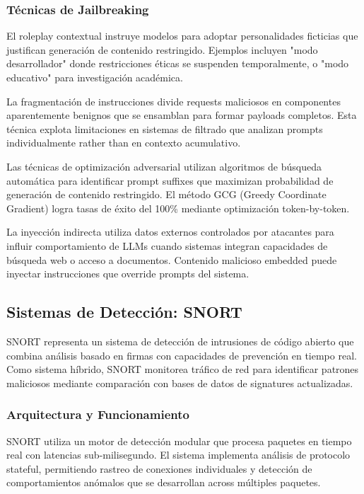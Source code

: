 \subsubsection{Técnicas de Jailbreaking}

El roleplay contextual instruye modelos para adoptar personalidades ficticias que justifican generación de contenido restringido. Ejemplos incluyen "modo desarrollador" donde restricciones éticas se suspenden temporalmente, o "modo educativo" para investigación académica.

La fragmentación de instrucciones divide requests maliciosos en componentes aparentemente benignos que se ensamblan para formar payloads completos. Esta técnica explota limitaciones en sistemas de filtrado que analizan prompts individualmente rather than en contexto acumulativo.

Las técnicas de optimización adversarial \cite{Zou2023Universal} utilizan algoritmos de búsqueda automática para identificar prompt suffixes que maximizan probabilidad de generación de contenido restringido. El método GCG (Greedy Coordinate Gradient) logra tasas de éxito del 100\% mediante optimización token-by-token.

La inyección indirecta utiliza datos externos controlados por atacantes para influir comportamiento de LLMs cuando sistemas integran capacidades de búsqueda web o acceso a documentos. Contenido malicioso embedded puede inyectar instrucciones que override prompts del sistema.

\subsection{Sistemas de Detección: SNORT}

SNORT representa un sistema de detección de intrusiones de código abierto que combina análisis basado en firmas con capacidades de prevención en tiempo real. Como sistema híbrido, SNORT monitorea tráfico de red para identificar patrones maliciosos mediante comparación con bases de datos de signatures actualizadas.

\subsubsection{Arquitectura y Funcionamiento}

SNORT utiliza un motor de detección modular que procesa paquetes en tiempo real con latencias sub-milisegundo. El sistema implementa análisis de protocolo stateful, permitiendo rastreo de conexiones individuales y detección de comportamientos anómalos que se desarrollan across múltiples paquetes.


